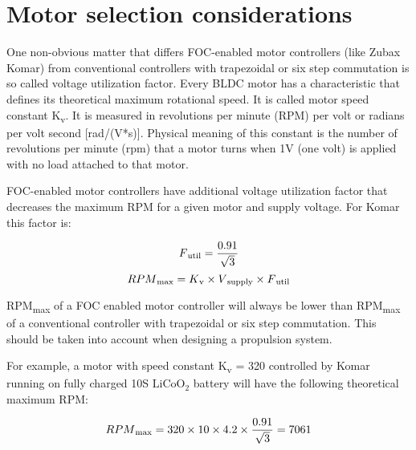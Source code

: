 \chapter{Motor selection considerations}
One non-obvious matter that differs FOC-enabled motor controllers (like Zubax Komar)
from conventional controllers with trapezoidal or six step commutation 
is so called voltage utilization factor.
Every BLDC motor has a characteristic that defines its theoretical maximum rotational speed. 
It is called  motor speed constant K\textsubscript{v}. 
It is measured in revolutions per minute (RPM) per volt or radians per volt second [rad/(V*s)].
Physical meaning of this constant is the number of revolutions per minute (rpm) that a motor turns when 1V (one volt) 
is applied with no load attached to that motor. 

FOC-enabled motor controllers have additional voltage utilization factor that decreases the maximum RPM 
for a given motor and supply voltage. For Komar this factor is:

\[F\textsubscript{util} = \frac{0.91}{\sqrt{3}}\]
\[RPM\textsubscript{max} = K\textsubscript{v} \times V\textsubscript{supply} \times F\textsubscript{util}\]

RPM\textsubscript{max} of a FOC enabled motor controller will always be lower than RPM\textsubscript{max} 
of a conventional controller with trapezoidal or six step commutation. This should be taken into account 
when designing a propulsion system.

For example, a motor with speed constant K\textsubscript{v} = 320 controlled by Komar running on fully charged 10S $\text{LiCoO}_\text{2}$ battery will have the following theoretical maximum RPM:

\[RPM\textsubscript{max} = 320 \times 10 \times 4.2 \times \frac{0.91}{\sqrt{3}} = 7061\]